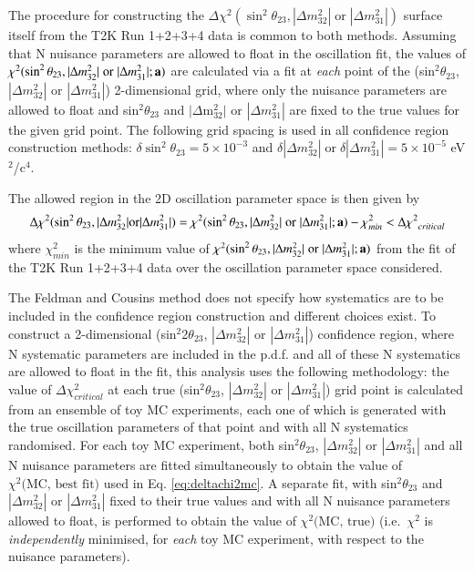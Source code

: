 The procedure for constructing the $\Delta\chi^{2}(\sin^{2}\theta_{23},|\Delta m^{2}_{32}| \; \textrm{or} \; |\Delta m^{2}_{31}|)$
surface itself from the T2K Run 1+2+3+4 data is common to both methods.
Assuming that N nuisance parameters are allowed to float in the oscillation fit,
the values of $\chi^{2}(\sin^{2}\theta_{23},|\Delta m^{2}_{32}| \; \textrm{or} \; |\Delta m^{2}_{31}|; {\bf a})$
are calculated via a fit at \emph{each} point of the (sin$^{2}\theta_{23}$, $|\Delta m^{2}_{32}|$ or $|\Delta m^{2}_{31}|$)
2-dimensional grid, where only the nuisance parameters are allowed to float
and sin$^{2}\theta_{23}$ and $|\Delta$m$^{2}_{32}|$ or $|\Delta m^{2}_{31}|$ are fixed to the true values for the given grid point.
The following grid spacing is used in all confidence region construction methods:
$\delta{\sin^{2}\theta_{23}}=5\times10^{-3}$ and
$\delta |\Delta{m^{2}_{32}}| \; \textrm{or} \; \delta |\Delta m^{2}_{31}|=5\times10^{-5}$ eV$^{2}$/c$^{4}$.

The allowed region in the 2D oscillation parameter space is then given by
\begin{equation}
\displaystyle
\Delta\chi^{2}(\sin^{2}\theta_{23},|\Delta m^{2}_{32}| \textrm{or} |\Delta m^{2}_{31}|) =
\chi^{2}(\sin^{2}\theta_{23},|\Delta m^{2}_{32}| \; \textrm{or} \; |\Delta m^{2}_{31}|; {\bf a}) - \chi_{min}^{2} < \Delta{\chi^{2}}_{critical}
\label{eq:chiconfregion}
\end{equation}
where $\chi_{min}^{2}$ is the minimum value of $\chi^{2}(\sin^{2}\theta_{23},|\Delta m^{2}_{32}| \; \textrm{or} \; |\Delta m^{2}_{31}|; {\bf a})$
from the fit of the T2K Run 1+2+3+4 data over the oscillation parameter space considered.

The Feldman and Cousins method does not specify how systematics are to be included 
in the confidence region construction and different choices exist. 
To construct a 2-dimensional (sin$^{2}$2$\theta_{23}$, $|\Delta m^{2}_{32}|$ or $|\Delta m^{2}_{31}|$) confidence region, 
where N systematic parameters are included in the p.d.f. and all of these N systematics are allowed to float in the fit,
this analysis uses the following methodology: 
the value of $\Delta\chi^{2}_{critical}$ at each true (sin$^{2}\theta_{23}$, $|\Delta m^{2}_{32}|$ or $|\Delta m^{2}_{31}|$) grid point 
is calculated from an ensemble of toy MC experiments,
each one of which is generated with the true oscillation parameters of that point and with all N systematics randomised.
For each toy MC experiment, both sin$^{2}\theta_{23}$, $|\Delta m^{2}_{32}|$ or $|\Delta m^{2}_{31}|$ and all N nuisance parameters are fitted
simultaneously to obtain the value of $\chi^{2} \textrm{(MC, best fit)}$ used in Eq. \ref{eq:deltachi2mc}.
A separate fit, with sin$^{2}\theta_{23}$ and $|\Delta m^{2}_{32}|$ or $|\Delta m^{2}_{31}|$ fixed to their true values
and with all N nuisance parameters allowed to float, is performed to obtain the value of 
$\chi^{2} \textrm{(MC, true)}$ (i.e.\ $\chi^{2}$ is \emph{independently} minimised, for \emph{each} toy MC experiment, with 
respect to the nuisance parameters).

